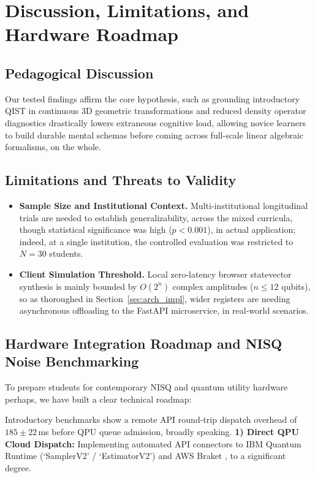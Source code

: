 \documentclass[conference]{IEEEtran}
\begin{document}
\section{Discussion, Limitations, and Hardware Roadmap}
\label{sec:discussion}

\subsection{Pedagogical Discussion}
Our tested findings affirm the core hypothesis, such as grounding introductory QIST in continuous 3D geometric transformations and reduced density operator diagnostics drastically lowers extraneous cognitive load, allowing novice learners to build durable mental schemas before coming across full-scale linear algebraic formalisms, on the whole.

\subsection{Limitations and Threats to Validity}
\begin{itemize}[leftmargin=*,noitemsep,topsep=1pt]
    \item \textbf{Sample Size and Institutional Context.} Multi-institutional longitudinal trials are needed to establish generalizability, across the mixed curricula, though statistical significance was high ($p < 0.001$), in actual application; indeed, at a single institution, the controlled evaluation was restricted to $N=30$ students.
    \item \textbf{Client Simulation Threshold.} Local zero-latency browser statevector synthesis is mainly bounded by $O(2^n)$ complex amplitudes ($n \le 12$ qubits), so as thoroughed in Section~\ref{sec:arch_impl}, wider registers are needing asynchronous offloading to the FastAPI microservice, in real-world scenarios.
\end{itemize}

\subsection{Hardware Integration Roadmap and NISQ Noise Benchmarking}
To prepare students for contemporary NISQ and quantum utility hardware perhaps, we have built a clear technical roadmap:

Introductory benchmarks show a remote API round-trip dispatch overhead of $185 \pm 22$\,ms before QPU queue admission, broadly speaking. \noindent\textbf{1) Direct QPU Cloud Dispatch:} Implementing automated API connectors to IBM Quantum Runtime (`SamplerV2' / `EstimatorV2') and AWS Braket \cite{b30}, to a significant degree.
\end{document}
